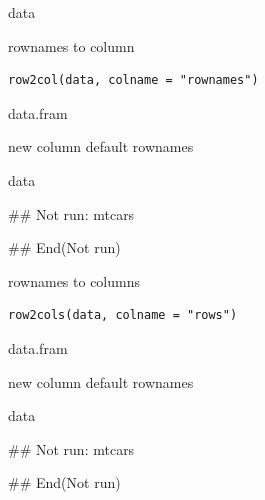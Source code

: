\documentclass[a4paper]{book}
\begin{document}
%
\begin{Value}
data
\end{Value}
%
\begin{Description}
rownames to column
\end{Description}
%
\begin{Usage}
\begin{verbatim}
row2col(data, colname = "rownames")
\end{verbatim}
\end{Usage}
%
\begin{Arguments}
\begin{ldescription}
\item[\code{data}] data.fram

\item[\code{colname}] new column default rownames
\end{ldescription}
\end{Arguments}
%
\begin{Value}
data
\end{Value}
%
\begin{Examples}
\begin{ExampleCode}

## Not run: 
mtcars %

## End(Not run)

\end{ExampleCode}
\end{Examples}
%
\begin{Description}
rownames to columns
\end{Description}
%
\begin{Usage}
\begin{verbatim}
row2cols(data, colname = "rows")
\end{verbatim}
\end{Usage}
%
\begin{Arguments}
\begin{ldescription}
\item[\code{data}] data.fram

\item[\code{colname}] new column default rownames
\end{ldescription}
\end{Arguments}
%
\begin{Value}
data
\end{Value}
%
\begin{Examples}
\begin{ExampleCode}

## Not run: 
mtcars %

## End(Not run)

\end{ExampleCode}
\end{Examples}
\end{document}
